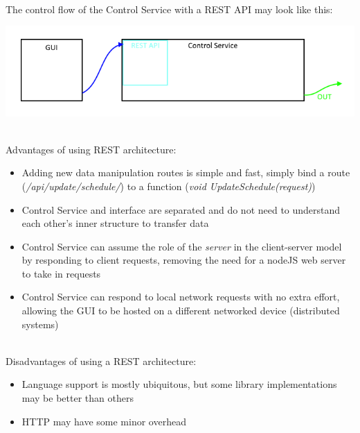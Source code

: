 		\noindent \\The control flow of the Control Service with a REST API may look like this:

		\includegraphics[width=\linewidth]{techreview/RESTDiag.png}

		\noindent \\Advantages of using REST architecture:
		\begin{itemize}
			\item Adding new data manipulation routes is simple and fast, simply bind a route (\textit{/api/update/schedule/}) to a function (\textit{void UpdateSchedule(request)})
			\item Control Service and interface are separated and do not need to understand each other's inner structure to transfer data
			\item Control Service can assume the role of the \textit{server} in the client-server model by responding to client requests, removing the need for a nodeJS web server to take in requests
			\item Control Service can respond to local network requests with no extra effort, allowing the GUI to be hosted on a different networked device (distributed systems)
		\end{itemize}

		\noindent \\Disadvantages of using a REST architecture:
		\begin{itemize}
			\item Language support is mostly ubiquitous, but some library implementations may be better than others
			\item HTTP may have some minor overhead
		\end{itemize}


